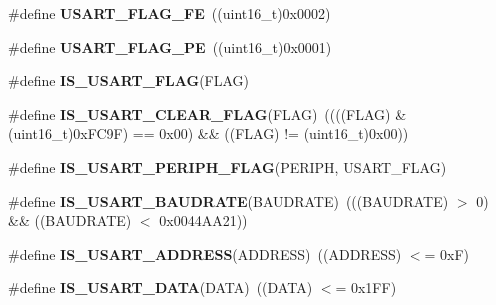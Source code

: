 \begin{DoxyCompactItemize}
\item 
\hypertarget{group__USART__Flags_ga3551a32bac49a2ec040e5fdafcc9c4bd}{
\#define {\bfseries USART\_\-FLAG\_\-FE}~((uint16\_\-t)0x0002)}
\label{group__USART__Flags_ga3551a32bac49a2ec040e5fdafcc9c4bd}

\item 
\hypertarget{group__USART__Flags_ga5e87fde5704f27c75df25395e23404ad}{
\#define {\bfseries USART\_\-FLAG\_\-PE}~((uint16\_\-t)0x0001)}
\label{group__USART__Flags_ga5e87fde5704f27c75df25395e23404ad}

\item 
\#define {\bfseries IS\_\-USART\_\-FLAG}(FLAG)
\item 
\hypertarget{group__USART__Flags_gadc905fdce8defba31c00c95554a26bc3}{
\#define {\bfseries IS\_\-USART\_\-CLEAR\_\-FLAG}(FLAG)~((((FLAG) \& (uint16\_\-t)0xFC9F) == 0x00) \&\& ((FLAG) != (uint16\_\-t)0x00))}
\label{group__USART__Flags_gadc905fdce8defba31c00c95554a26bc3}

\item 
\#define {\bfseries IS\_\-USART\_\-PERIPH\_\-FLAG}(PERIPH, USART\_\-FLAG)
\item 
\hypertarget{group__USART__Flags_ga9dc365e0a1e01031a8e0757a34b9d420}{
\#define {\bfseries IS\_\-USART\_\-BAUDRATE}(BAUDRATE)~(((BAUDRATE) $>$ 0) \&\& ((BAUDRATE) $<$ 0x0044AA21))}
\label{group__USART__Flags_ga9dc365e0a1e01031a8e0757a34b9d420}

\item 
\hypertarget{group__USART__Flags_ga194e771c3324f9e130b2887c701460a7}{
\#define {\bfseries IS\_\-USART\_\-ADDRESS}(ADDRESS)~((ADDRESS) $<$= 0xF)}
\label{group__USART__Flags_ga194e771c3324f9e130b2887c701460a7}

\item 
\hypertarget{group__USART__Flags_gafd6307e41818e076d31f3c24cb5ba135}{
\#define {\bfseries IS\_\-USART\_\-DATA}(DATA)~((DATA) $<$= 0x1FF)}
\label{group__USART__Flags_gafd6307e41818e076d31f3c24cb5ba135}

\end{DoxyCompactItemize}


